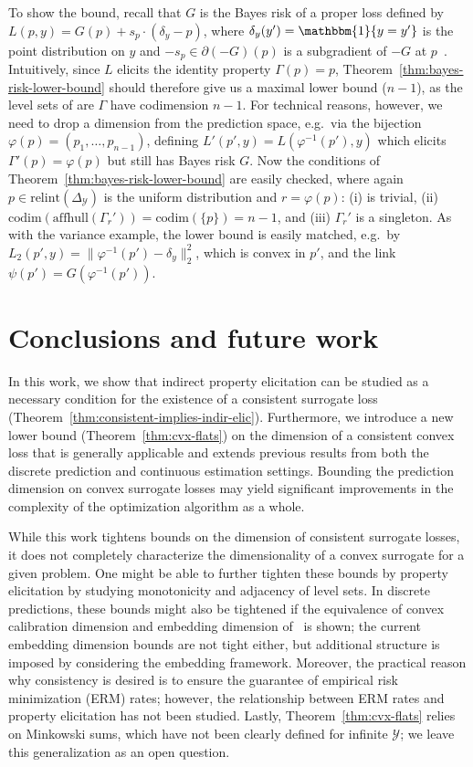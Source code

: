 \documentclass{article}
\newcommand{\simplex}{\Delta_\Y}
\newcommand{\relint}[1]{\mathrm{relint}(#1)}
\newcommand{\codim}{\mathrm{codim}}
\newcommand{\affhull}{\mathrm{affhull}}
\newcommand{\Y}{\mathcal{Y}}
\newcommand{\ones}{\mathbbm{1}}
\begin{document}
To show the bound, recall that $G$ is the Bayes risk of a proper loss defined by $L(p,y) = G(p) + s_p \cdot (\delta_y - p)$, where $\delta_y(y') = \ones\{y=y'\}$ is the point distribution on $y$ and $-s_p \in \partial (-G)(p)$ is a subgradient of $-G$ at $p$~\citep{gneiting2007strictly,reid2009surrogate,frongillo2014general}.
Intuitively, since $L$ elicits the identity property $\Gamma(p)=p$, Theorem~\ref{thm:bayes-risk-lower-bound} should therefore give us a maximal lower bound ($n-1$), as the level sets of are $\Gamma$ have codimension $n-1$.
For technical reasons, however, we need to drop a dimension from the prediction space, e.g.\ via the bijection $\varphi(p) = (p_1,\ldots,p_{n-1})$, defining $L'(p',y) = L(\varphi^{-1}(p'),y)$ which elicits $\Gamma'(p) = \varphi(p)$ but still has Bayes risk $G$.
Now the conditions of Theorem~\ref{thm:bayes-risk-lower-bound} are easily checked, where again $p\in\relint\simplex$ is the uniform distribution and $r=\varphi(p)$: (i) is trivial, (ii) $\codim(\affhull(\Gamma_r')) = \codim(\{p\}) = n-1$, and (iii) $\Gamma_r'$ is a singleton.
As with the variance example, the lower bound is easily matched, e.g.\ by $L_2(p',y) = \|\varphi^{-1}(p')-\delta_y\|_2^2$, which is convex in $p'$, and the link $\psi(p') = G(\varphi^{-1}(p'))$.


\section{Conclusions and future work}\label{sec:conclusions}
In this work, we show that indirect property elicitation can be studied as a necessary condition for the existence of a consistent surrogate loss (Theorem~\ref{thm:consistent-implies-indir-elic}).
Furthermore, we introduce a new lower bound (Theorem~\ref{thm:cvx-flats}) on the dimension of a consistent convex loss that is generally applicable and extends previous results from both the discrete prediction and continuous estimation settings.
Bounding the prediction dimension on convex surrogate losses may yield significant improvements in the complexity of the optimization algorithm as a whole.

While this work tightens bounds on the dimension of consistent surrogate losses, it does not completely characterize the dimensionality of a convex surrogate for a given problem.
One might be able to further tighten these bounds by property elicitation by studying monotonicity and adjacency of level sets.
In discrete predictions, these bounds might also be tightened if the equivalence of convex calibration dimension and embedding dimension of~\citet{finocchiaro2020embedding} is shown; the current embedding dimension bounds are not tight either, but additional structure is imposed by considering the embedding framework.
Moreover, the practical reason why consistency is desired is to ensure the guarantee of empirical risk minimization (ERM) rates; however, the relationship between ERM rates and property elicitation has not been studied.
Lastly, Theorem~\ref{thm:cvx-flats} relies on Minkowski sums, which have not been clearly defined for infinite $\Y$; we leave this generalization as an open question.
\end{document}
